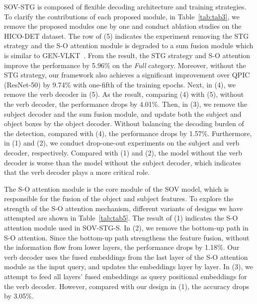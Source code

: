 \documentclass[10pt,twocolumn,letterpaper]{article}
\begin{document}
\quad SOV-STG is composed of flexible decoding architecture and training strategies.
To clarify the contributions of each proposed module, in Table~\ref{tab:tab3}, we remove the proposed modules one by one and conduct ablation studies on the HICO-DET dataset.
The row of (5) indicates the experiment removing the STG strategy and the S-O attention module is degraded to a sum fusion module which is similar to GEN-VLKT~\cite{liao2022gen}.
From the result, the STG strategy and S-O attention improve the performance by 5.96\% on the \textit{Full} category.
Moreover, without the STG strategy, our framework also achieves a significant improvement over QPIC (ResNet-50) by 9.74\% with one-fifth of the training epochs.
Next, in (4), we remove the verb decoder in (5).
As the result, comparing (4) with (5), without the verb decoder, the performance drops by 4.01\%.
Then, in (3), we remove the subject decoder and the sum fusion module, and update both the subject and object boxes by the object decoder.
Without balancing the decoding burden of the detection, compared with (4), the performance drops by 1.57\%.
Furthermore, in (1) and (2), we conduct drop-one-out experiments on the subject and verb decoder, respectively.
Compared with (1) and (2), the model without the verb decoder is worse than the model without the subject decoder, which indicates that the verb decoder plays a more critical role.

\quad The S-O attention module is the core module of the SOV model, which is responsible for the fusion of the object and subject features.
To explore the strength of the S-O attention mechanism, different variants of designs we have attempted are shown in Table~\ref{tab:tab5}.
The result of (1) indicates the S-O attention module used in SOV-STG-S.
In (2), we remove the bottom-up path in S-O attention.
Since the bottom-up path strengthens the feature fusion, without the information flow from lower layers, the performance drops by 1.18\%.
Our verb decoder uses the fused embeddings from the last layer of the S-O attention module as the input query, and updates the embeddings layer by layer.
In (3), we attempt to feed all layers' fused embeddings as query positional embeddings for the verb decoder.
However, compared with our design in (1), the accuracy drops by 3.05\%.
\end{document}
